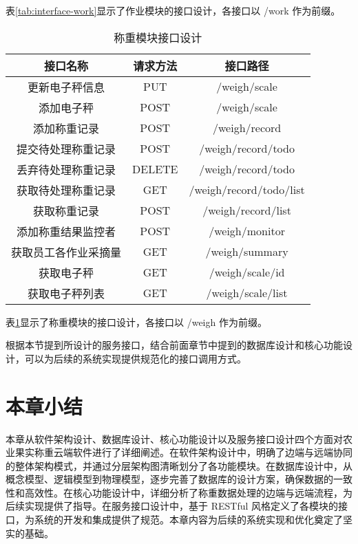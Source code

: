 表\ref{tab:interface-work}显示了作业模块的接口设计，各接口以 /work 作为前缀。

\begin{table}[H]
\centering
\caption{称重模块接口设计}
\label{tab:interface-weigh}
\begin{tabular}{|c|c|c|}
\hline
接口名称 & 请求方法 & 接口路径 \\\hline
更新电子秤信息 & PUT & /weigh/scale \\ \hline
添加电子秤 & POST & /weigh/scale \\\hline
添加称重记录 & POST & /weigh/record \\\hline
提交待处理称重记录 & POST & /weigh/record/todo \\\hline
丢弃待处理称重记录 & DELETE & /weigh/record/todo \\\hline
获取待处理称重记录 & GET & /weigh/record/todo/list \\\hline
获取称重记录 & POST & /weigh/record/list \\\hline
添加称重结果监控者 & POST & /weigh/monitor \\\hline
获取员工各作业采摘量 & GET & /weigh/summary \\\hline
获取电子秤 & GET & /weigh/scale/{id} \\\hline
获取电子秤列表 & GET & /weigh/scale/list \\\hline
\end{tabular}
\end{table}

表\ref{tab:interface-weigh}显示了称重模块的接口设计，各接口以 /weigh 作为前缀。

根据本节提到所设计的服务接口，结合前面章节中提到的数据库设计和核心功能设计，可以为后续的系统实现提供规范化的接口调用方式。

\section{本章小结}

本章从软件架构设计、数据库设计、核心功能设计以及服务接口设计四个方面对农业果实称重云端软件进行了详细阐述。在软件架构设计中，明确了边端与远端协同的整体架构模式，并通过分层架构图清晰划分了各功能模块。在数据库设计中，从概念模型、逻辑模型到物理模型，逐步完善了数据库的设计方案，确保数据的一致性和高效性。在核心功能设计中，详细分析了称重数据处理的边端与远端流程，为后续实现提供了指导。在服务接口设计中，基于 RESTful 风格定义了各模块的接口，为系统的开发和集成提供了规范。本章内容为后续的系统实现和优化奠定了坚实的基础。
